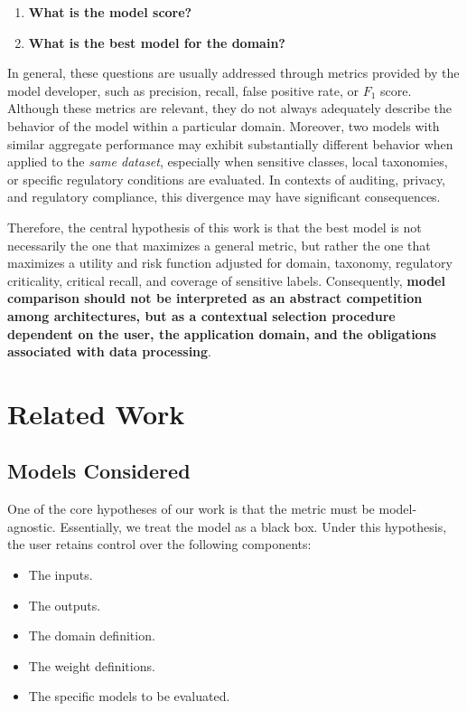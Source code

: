 \documentclass[11pt,a4paper]{article}
\begin{document}
\begin{enumerate}
    \item \textbf{What is the model score?}
    \item \textbf{What is the best model for the domain?}
\end{enumerate}

In general, these questions are usually addressed through metrics provided by the model developer, such as precision, recall, false positive rate, or $F_1$ score. Although these metrics are relevant, they do not always adequately describe the behavior of the model within a particular domain. Moreover, two models with similar aggregate performance may exhibit substantially different behavior when applied to the \textit{same dataset}, especially when sensitive classes, local taxonomies, or specific regulatory conditions are evaluated. In contexts of auditing, privacy, and regulatory compliance, this divergence may have significant consequences.

Therefore, the central hypothesis of this work is that the best model is not necessarily the one that maximizes a general metric, but rather the one that maximizes a utility and risk function adjusted for domain, taxonomy, regulatory criticality, critical recall, and coverage of sensitive labels. Consequently, \textbf{model comparison should not be interpreted as an abstract competition among architectures, but as a contextual selection procedure dependent on the user, the application domain, and the obligations associated with data processing}.

\section{Related Work}

\subsection{Models Considered}

One of the core hypotheses of our work is that the metric must be model-agnostic. Essentially, we treat the model as a black box. Under this hypothesis, the user retains control over the following components:

\begin{itemize}
    \item The inputs.
    \item The outputs.
    \item The domain definition.
    \item The weight definitions.
    \item The specific models to be evaluated.
\end{itemize}
\end{document}
